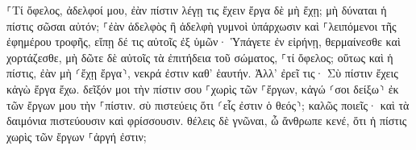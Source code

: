 \documentclass{openreader}
\begin{document}
⸀Τί ὄφελος, ἀδελφοί μου, ἐὰν πίστιν λέγῃ τις ἔχειν ἔργα δὲ μὴ ἔχῃ; μὴ δύναται ἡ πίστις σῶσαι αὐτόν; 
⸀ἐὰν ἀδελφὸς ἢ ἀδελφὴ γυμνοὶ ὑπάρχωσιν καὶ ⸀λειπόμενοι τῆς ἐφημέρου τροφῆς, 
εἴπῃ δέ τις αὐτοῖς ἐξ ὑμῶν· Ὑπάγετε ἐν εἰρήνῃ, θερμαίνεσθε καὶ χορτάζεσθε, μὴ δῶτε δὲ αὐτοῖς τὰ ἐπιτήδεια τοῦ σώματος, ⸀τί ὄφελος; 
οὕτως καὶ ἡ πίστις, ἐὰν μὴ ⸂ἔχῃ ἔργα⸃, νεκρά ἐστιν καθ’ ἑαυτήν. 
Ἀλλ’ ἐρεῖ τις· Σὺ πίστιν ἔχεις κἀγὼ ἔργα ἔχω. δεῖξόν μοι τὴν πίστιν σου ⸀χωρὶς τῶν ⸀ἔργων, κἀγώ ⸂σοι δείξω⸃ ἐκ τῶν ἔργων μου τὴν ⸀πίστιν. 
σὺ πιστεύεις ὅτι ⸂εἷς ἐστιν ὁ θεός⸃; καλῶς ποιεῖς· καὶ τὰ δαιμόνια πιστεύουσιν καὶ φρίσσουσιν. 
θέλεις δὲ γνῶναι, ὦ ἄνθρωπε κενέ, ὅτι ἡ πίστις χωρὶς τῶν ἔργων ⸀ἀργή ἐστιν; 
\end{document}
